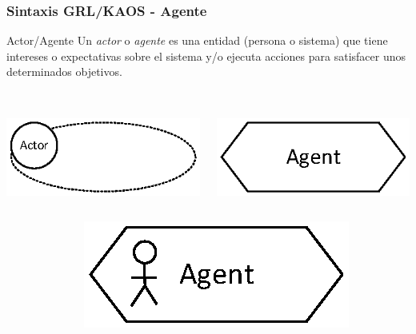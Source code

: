 \documentclass[handout,slidestop,xcolor=pst,dvips,blue]{beamer}
\begin{document}
\begin{frame}[c]
    \frametitle{Sintaxis GRL/KAOS - Agente}
    \begin{block}{Actor/Agente}
        Un \alert{\emph{actor}} o \alert{\emph{agente}} es una entidad (persona o sistema) que tiene intereses o expectativas sobre el sistema y/o ejecuta acciones para satisfacer unos determinados objetivos.
        \ \\
        \ \\
        \begin{columns}[c]
            \begin{column}{0.50\linewidth}
                \centering \includegraphics[width=0.50\columnwidth,keepaspectratio=true]{images/objetivos/actor(GRL).eps}
            \end{column}
            \begin{column}{0.50\linewidth}
                \centering \includegraphics[width=0.50\columnwidth,keepaspectratio=true]{images/objetivos/agent(KAOS).eps}
            \end{column}
        \end{columns}
        \begin{columns}[c]
            \begin{column}{0.50\linewidth}
            \end{column}
            \begin{column}{0.50\linewidth}
                \centering \includegraphics[width=0.50\columnwidth,keepaspectratio=true]{images/objetivos/enviromentalAgent(KAOS).eps}
            \end{column}
        \end{columns}
     \end{block}
\end{frame}
\end{document}
